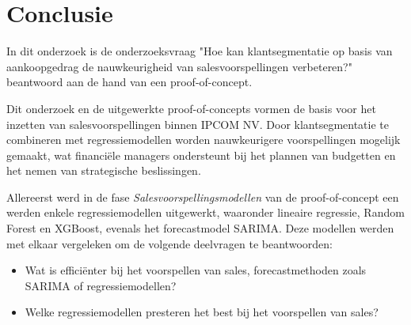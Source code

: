 
\chapter{Conclusie}%
\label{ch:conclusie}


In dit onderzoek is de onderzoeksvraag "Hoe kan klantsegmentatie op basis van aankoopgedrag de nauwkeurigheid van salesvoorspellingen verbeteren?" beantwoord aan de hand van een proof-of-concept.

\vspace{1 em}

Dit onderzoek en de uitgewerkte proof-of-concepts vormen de basis voor het inzetten van salesvoorspellingen binnen IPCOM NV. Door klantsegmentatie te combineren met regressiemodellen worden nauwkeurigere voorspellingen mogelijk gemaakt, wat financiële managers ondersteunt bij het plannen van budgetten en het nemen van strategische beslissingen.

\vspace{1 em}

Allereerst werd in de fase \textit{Salesvoorspellingsmodellen} van de proof-of-concept een werden enkele regressiemodellen uitgewerkt, waaronder lineaire regressie, Random Forest en XGBoost, evenals het forecastmodel SARIMA. Deze modellen werden met elkaar vergeleken om de volgende deelvragen te beantwoorden:

\begin{itemize}
    \item Wat is efficiënter bij het voorspellen van sales, forecastmethoden zoals SARIMA of regressiemodellen?
    \item Welke regressiemodellen presteren het best bij het voorspellen van sales?
\end{itemize}

\vspace{1 em}

